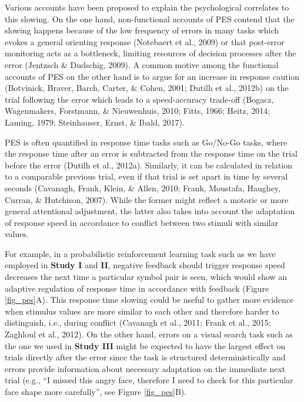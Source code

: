 \documentclass[12pt,openany]{book}
\theoremstyle{definition}
\theoremstyle{definition}
\theoremstyle{definition}
\theoremstyle{remark}
\begin{document}
Various accounts have been proposed to explain the psychological
correlates to this slowing. On the one hand, non-functional accounts of
PES contend that the slowing happens because of the low frequency of
errors in many tasks which evokes a general orienting response
(Notebaert et al., 2009) or that post-error monitoring acts as a
bottleneck, limiting resources of decision processes after the error
(Jentzsch \& Dudschig, 2009). A common motive among the functional
accounts of PES on the other hand is to argue for an increase in
response caution (Botvinick, Braver, Barch, Carter, \& Cohen, 2001;
Dutilh et al., 2012b) on the trial following the error which leads to a
speed-accuracy trade-off (Bogacz, Wagenmakers, Forstmann, \&
Nieuwenhuis, 2010; Fitts, 1966; Heitz, 2014; Laming, 1979; Steinhauser,
Ernst, \& Ibald, 2017).

PES is often quantified in response time tasks such as Go/No-Go tasks,
where the response time after an error is subtracted from the response
time on the trial before the error (Dutilh et al., 2012a). Similarly, it
can be calculated in relation to a comparable previous trial, even if
that trial is set apart in time by several seconds (Cavanagh, Frank,
Klein, \& Allen, 2010; Frank, Moustafa, Haughey, Curran, \& Hutchison,
2007). While the former might reflect a motoric or more general
attentional adjustment, the latter also takes into account the
adaptation of response speed in accordance to conflict between two
stimuli with similar values.

For example, in a probabilistic reinforcement learning task such as we
have employed in \textbf{Study I} and \textbf{II}, negative feedback
should trigger response speed decreases the next time a particular
symbol pair is seen, which would show an adaptive regulation of response
time in accordance with feedback (Figure \ref{fig_pes}A). This response
time slowing could be useful to gather more evidence when stimulus
values are more similar to each other and therefore harder to
distinguish, i.e., during conflict (Cavanagh et al., 2011; Frank et al.,
2015; Zaghloul et al., 2012). On the other hand, errors on a visual
search task such as the one we used in \textbf{Study III} might be
expected to have the largest effect on trials directly after the error
since the task is structured deterministically and errors provide
information about necessary adaptation on the immediate next trial
(e.g., ``I missed this angry face, therefore I need to check for this
particular face shape more carefully'', see Figure \ref{fig_pes}B).
\end{document}
